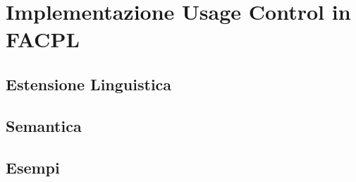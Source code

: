 \chapter{Implementazione Usage Control in FACPL}
\label{chap:Implementazione Usage Control in FACPL}
\section{Estensione Linguistica}
\label{sec:Estensione Linguistica}
\section{Semantica}
\label{sec:Semantica}
\section{Esempi}
\label{sec:Esempi}
